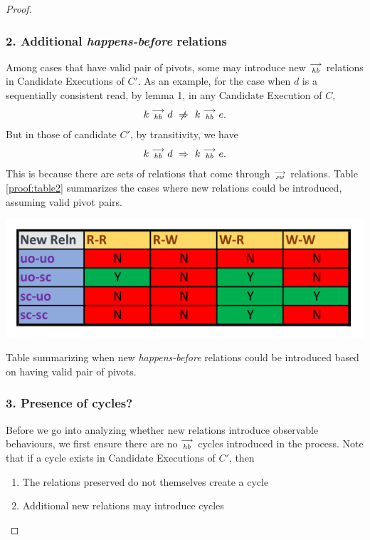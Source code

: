 \begin{proof}
        \subsubsection{2. Additional \textit{happens-before} relations}
        Among cases that have valid pair of pivots, some may introduce new $\stackrel{\longrightarrow}{_\textit{hb}}$ relations in Candidate Executions of $C'$. As an example, for the case when $d$ is a sequentially consistent read, by lemma 1, in any Candidate Execution of $C$,
        \begin{align*}
            \reln{k}{hb}{d} \ \centernot\Rightarrow \ \reln{k}{hb}{e}.
        \end{align*}
        But in those of candidate $C'$, by transitivity, we have 
        \begin{align*}
            k\stackrel{\longrightarrow}{_{\textit{hb}}}d \ \Rightarrow \ k\stackrel{\longrightarrow}{_{\textit{hb}}}e.
        \end{align*}
        This is because there are sets of relations that come through $\stackrel{\longrightarrow}{_\textit{sw}}$ relations. Table \ref{proof:table2} summarizes the cases where new relations could be introduced, assuming valid pivot pairs. 
        \begin{table}[H]
            \centering
            \includegraphics[scale=0.7]{Table2_Final.pdf}
            \caption{Table summarizing when new \textit{happens-before} relations could be introduced based on having valid pair of pivots.}
            \label{proof:table2}
        \end{table}
       
        \subsubsection{3. Presence of cycles?}
        Before we go into analyzing whether new relations introduce observable behaviours, we first ensure there are no $\stackrel{\longrightarrow}{_\textit{hb}}$ cycles introduced in the process. Note that if a cycle exists in Candidate Executions of $C'$, then 
        \begin{enumerate}
            \item The relations preserved do not themselves create a cycle
            \item Additional new relations may introduce cycles
        \end{enumerate}
       

\end{proof}
